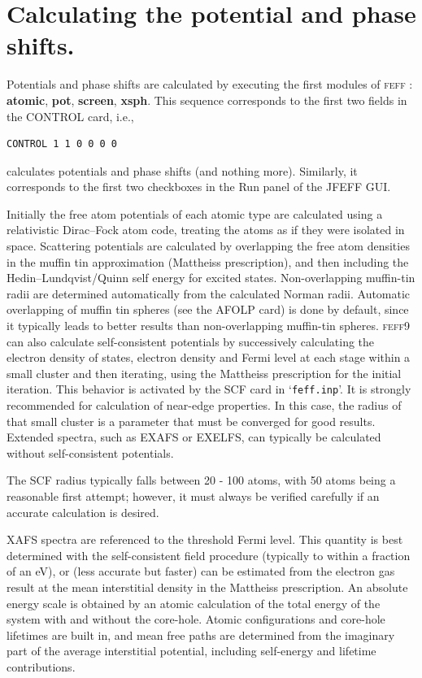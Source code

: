 \documentclass[11pt,oneside]{report} %
\newcommand{\program}[1]{\textsc{#1}}
\newcommand{\feff}{\program{feff}}
\newcommand{\vnum}{9}
\newcommand{\feffcur}{\feff\vnum}
\newcommand{\file}[1]{`\texttt{#1}'}
\newcommand{\module}[1]{\textrm{\bf{#1}}}
\begin{document}
\section{Calculating the potential and phase shifts.}
\label{sec:calcpots}
Potentials and phase shifts are calculated by executing the first modules of
{\feff} : \module{atomic}, \module{pot}, \module{screen}, \module{xsph}.  This
sequence corresponds to the first two fields in the CONTROL card, i.e.,
\begin{verbatim}
CONTROL 1 1 0 0 0 0 
\end{verbatim}
calculates potentials and phase shifts (and nothing more).  Similarly, it corresponds to the first two checkboxes in the Run panel of the JFEFF GUI.

Initially the free atom potentials of each atomic type are calculated
using a relativistic Dirac--Fock atom code, treating the atoms as if
they were isolated in space. Scattering potentials are
calculated by overlapping the free atom densities in the muffin tin
approximation (Mattheiss prescription), and then including the
Hedin--Lundqvist/Quinn self energy for excited states. 
Non-overlapping muffin-tin radii are determined automatically from
the calculated Norman radii. Automatic overlapping of muffin tin
spheres (see the AFOLP card) is done by default, since it typically
leads to better results than non-overlapping muffin-tin spheres.
{\feffcur} can also calculate self-consistent potentials by successively
calculating the electron density of states, electron density and Fermi
level at each stage within a small cluster and then iterating, using
the Mattheiss prescription for the initial iteration.  This behavior is activated by the SCF card in \file{feff.inp}.  
It is strongly recommended for calculation of near-edge properties.  In this case, the radius
of that small cluster is a parameter that must be converged for good results.  Extended spectra, such as EXAFS or EXELFS,
can typically be calculated without self-consistent potentials.

The SCF radius typically falls between 20 - 100 atoms, with 50 atoms being a reasonable first attempt; however, it must always be verified carefully if an accurate calculation is desired.

XAFS spectra are referenced to the threshold Fermi level. This
quantity is best determined with the self-consistent field procedure 
(typically to within a fraction of an eV), 
or (less accurate but faster) can be estimated from the electron
gas result at the mean interstitial density in the Mattheiss prescription. 
An absolute energy scale is obtained by an atomic
calculation of the total energy of the system with and without the
core-hole. Atomic configurations and core-hole lifetimes are built
in, and mean free paths are determined from the imaginary part of the
average interstitial potential, including self-energy and lifetime
contributions.
\end{document}
